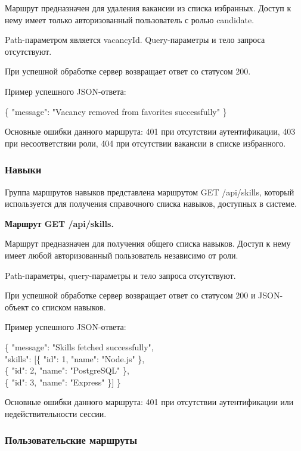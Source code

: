 Маршрут предназначен для удаления вакансии из списка избранных. Доступ к нему имеет только авторизованный пользователь с ролью candidate.

Path-параметром является vacancyId. Query-параметры и тело запроса отсутствуют.

При успешной обработке сервер возвращает ответ со статусом 200.

Пример успешного JSON-ответа:

\begin{flushleft}
	\small\ttfamily
	\{ "message": "Vacancy removed from favorites successfully" \}
\end{flushleft}

Основные ошибки данного маршрута: 401 при отсутствии аутентификации, 403 при несоответствии роли, 404 при отсутствии вакансии в списке избранного.

\subsubsection{Навыки}

Группа маршрутов навыков представлена маршрутом GET /api/skills, который используется для получения справочного списка навыков, доступных в системе.

\textbf{Маршрут GET /api/skills.}

Маршрут предназначен для получения общего списка навыков. Доступ к нему имеет любой авторизованный пользователь независимо от роли.

Path-параметры, query-параметры и тело запроса отсутствуют.

При успешной обработке сервер возвращает ответ со статусом 200 и JSON-объект со списком навыков.

Пример успешного JSON-ответа:

\begin{flushleft}
	\small\ttfamily
	\{ "message": "Skills fetched successfully",\\
	"skills": [\{ "id": 1, "name": "Node.js" \},\\
	\{ "id": 2, "name": "PostgreSQL" \},\\
	\{ "id": 3, "name": "Express" \}] \}
\end{flushleft}

Основные ошибки данного маршрута: 401 при отсутствии аутентификации или недействительности сессии.

\subsubsection{Пользовательские маршруты}


